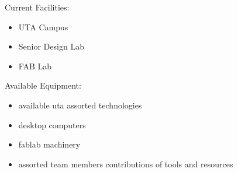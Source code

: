Current Facilities:
\begin{itemize}
    \item UTA Campus
    \item Senior Design Lab
    \item FAB Lab
\end{itemize}
\smallskip
Available Equipment:
\begin{itemize}
    \item available uta assorted technologies
    \item desktop computers
    \item fablab machinery
    \item assorted team members contributions of tools and resources
\end{itemize}


